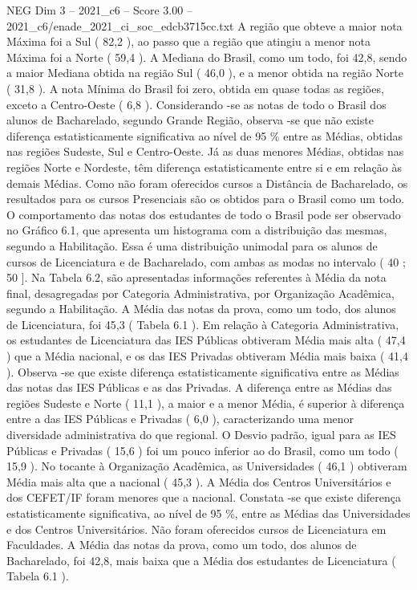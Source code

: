 \begin{textsample}{NEG Dim 3 – 2021\_c6 – Score 3.00 – 2021\_c6/enade\_2021\_ci\_soc\_edcb3715cc.txt}
A região que obteve a maior nota Máxima foi a Sul ( 82,2 ), ao passo que a região que atingiu a menor nota Máxima foi a Norte ( 59,4 ).
A Mediana do Brasil, como um todo, foi 42,8, sendo a maior Mediana obtida na região Sul ( 46,0 ), e a menor obtida na região Norte ( 31,8 ).
A nota Mínima do Brasil foi zero, obtida em quase todas as regiões, exceto a Centro-Oeste ( 6,8 ).
Considerando -se as notas de todo o Brasil dos alunos de Bacharelado, segundo Grande Região, observa -se que não existe diferença estatisticamente significativa ao nível de 95 \% entre as Médias, obtidas nas regiões Sudeste, Sul e Centro-Oeste.
Já as duas menores Médias, obtidas nas regiões Norte e Nordeste, têm diferença estatisticamente entre si e em relação às demais Médias.
Como não foram oferecidos cursos a Distância de Bacharelado, os resultados para os cursos Presenciais são os obtidos para o Brasil como um todo.
O comportamento das notas dos estudantes de todo o Brasil pode ser observado no Gráfico 6.1, que apresenta um histograma com a distribuição das mesmas, segundo a Habilitação.
Essa é uma distribuição unimodal para os alunos de cursos de Licenciatura e de Bacharelado, com ambas as modas no intervalo ( 40 ; 50 ].
Na Tabela 6.2, são apresentadas informações referentes à Média da nota final, desagregadas por Categoria Administrativa, por Organização Acadêmica, segundo a Habilitação.
A Média das notas da prova, como um todo, dos alunos de Licenciatura, foi 45,3 ( Tabela 6.1 ).
Em relação à Categoria Administrativa, os estudantes de Licenciatura das IES Públicas obtiveram Média mais alta ( 47,4 ) que a Média nacional, e os das IES Privadas obtiveram Média mais baixa ( 41,4 ).
Observa -se que existe diferença estatisticamente significativa entre as Médias das notas das IES Públicas e as das Privadas.
A diferença entre as Médias das regiões Sudeste e Norte ( 11,1 ), a maior e a menor Média, é superior à diferença entre a das IES Públicas e Privadas ( 6,0 ), caracterizando uma menor diversidade administrativa do que regional.
O Desvio padrão, igual para as IES Públicas e Privadas ( 15,6 ) foi um pouco inferior ao do Brasil, como um todo ( 15,9 ).
No tocante à Organização Acadêmica, as Universidades ( 46,1 ) obtiveram Média mais alta que a nacional ( 45,3 ).
A Média dos Centros Universitários e dos CEFET/IF foram menores que a nacional.
Constata -se que existe diferença estatisticamente significativa, ao nível de 95 \%, entre as Médias das Universidades e dos Centros Universitários.
Não foram oferecidos cursos de Licenciatura em Faculdades.
A Média das notas da prova, como um todo, dos alunos de Bacharelado, foi 42,8, mais baixa que a Média dos estudantes de Licenciatura ( Tabela 6.1 ).

\end{textsample}
